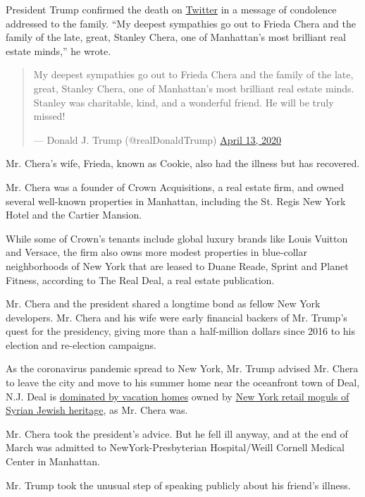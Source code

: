 President Trump confirmed the death on
\href{https://twitter.com/realDonaldTrump/status/1249808119217172489}{Twitter}
in a message of condolence addressed to the family. ``My deepest
sympathies go out to Frieda Chera and the family of the late, great,
Stanley Chera, one of Manhattan's most brilliant real estate minds,'' he
wrote.

\begin{quote}
My deepest sympathies go out to Frieda Chera and the family of the late,
great, Stanley Chera, one of Manhattan's most brilliant real estate
minds. Stanley was charitable, kind, and a wonderful friend. He will be
truly missed!

--- Donald J. Trump (@realDonaldTrump)
\href{https://twitter.com/realDonaldTrump/status/1249808119217172489?ref_src=twsrc\%5Etfw}{April
13, 2020}
\end{quote}

Mr. Chera's wife, Frieda, known as Cookie, also had the illness but has
recovered.

Mr. Chera was a founder of Crown Acquisitions, a real estate firm, and
owned several well-known properties in Manhattan, including the St.
Regis New York Hotel and the Cartier Mansion.

While some of Crown's tenants include global luxury brands like Louis
Vuitton and Versace, the firm also owns more modest properties in
blue-collar neighborhoods of New York that are leased to Duane Reade,
Sprint and Planet Fitness, according to The Real Deal, a real estate
publication.

Mr. Chera and the president shared a longtime bond as fellow New York
developers. Mr. Chera and his wife were early financial backers of Mr.
Trump's quest for the presidency, giving more than a half-million
dollars since 2016 to his election and re-election campaigns.

As the coronavirus pandemic spread to New York, Mr. Trump advised Mr.
Chera to leave the city and move to his summer home near the oceanfront
town of Deal, N.J. Deal is
\href{https://therealdeal.com/issues_articles/dominating-deal/}{dominated
by vacation homes} owned by
\href{https://www.nytimes3xbfgragh.onion/2009/07/25/nyregion/25deal.html}{New
York retail moguls of Syrian Jewish heritage}, as Mr. Chera was.

Mr. Chera took the president's advice. But he fell ill anyway, and at
the end of March was admitted to NewYork-Presbyterian Hospital/Weill
Cornell Medical Center in Manhattan.

Mr. Trump took the unusual step of speaking publicly about his friend's
illness.

